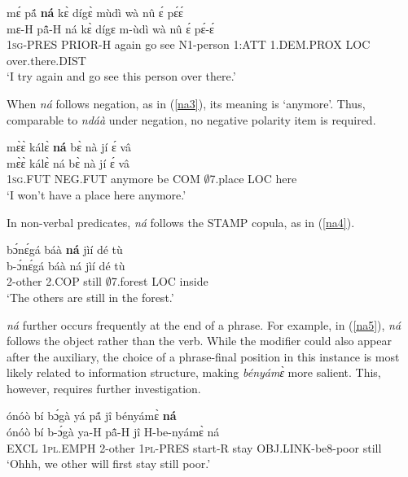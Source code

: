 \begin{exe} 
\ex\label{na2}
  \glll mɛ́ pã́ {\bfseries ná} kɛ̀ dígɛ̀ mùdì wà nû ɛ́ pɛ́ɛ́\\
        mɛ-H pã̂-H ná kɛ̀ dígɛ m-ùdì wà nû ɛ́ pɛ́-ɛ́ \\
        1\textsc{sg}-PRES PRIOR-H again go see N1-person 1:ATT 1.DEM.PROX LOC over.there.DIST \\
    \trans `I try again and go see this person over there.'
\end{exe}

When {\itshape ná} follows negation, as in (\ref{na3}), its meaning is `anymore'. Thus, comparable to {\itshape ndáà} under negation, no negative polarity item is required.

\begin{exe} 
\ex\label{na3}
  \glll  mɛ̀ɛ̀ kálɛ̀ {\bfseries ná} bɛ̀ nà jí ɛ́ vâ \\
        mɛ̀ɛ̀ kálɛ̀ ná bɛ̀ nà jí ɛ́ vâ \\
           1\textsc{sg}.FUT NEG.FUT anymore be COM $\emptyset$7.place LOC here  \\
    \trans `I won't have a place here anymore.'
\end{exe}


\noindent In non-verbal predicates, {\itshape ná} follows the STAMP copula, as in (\ref{na4}). 

\begin{exe} 
\ex\label{na4}
  \glll  bɔ́nɛ́gá báà {\bfseries ná} jìí dé tù \\
        b-ɔ́nɛ́gá báà ná jìí dé tù \\
          2-other 2.COP still $\emptyset$7.forest LOC inside  \\
    \trans `The others are still in the forest.'
\end{exe}

{\itshape ná} further occurs frequently at the end of a phrase. For example, in (\ref{na5}), {\itshape ná} follows the object rather than the verb. While the modifier could also appear after the auxiliary, the choice of a phrase-final position in this instance is most likely related to information structure, making {\itshape bényámɛ̀} more salient. This, however, requires further investigation.

\begin{exe} 
\ex\label{na5} 
  \glll  ónóò bí bɔ́gà yá pã́ jî bényámɛ̀ {\bfseries ná} \\
         ónóò bí b-ɔ́gà ya-H pã̂-H jî H-be-nyámɛ̀ ná \\
         EXCL 1\textsc{pl}.EMPH 2-other 1\textsc{pl}-PRES start-R stay OBJ.LINK-be8-poor still \\
    \trans `Ohhh, we other will first stay still poor.'
\end{exe}

